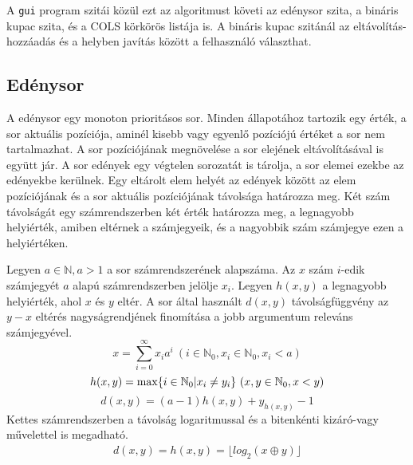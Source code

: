 A \texttt{gui} program szitái közül ezt az algoritmust követi az edénysor szita, a bináris kupac szita, és a COLS körkörös listája is. A bináris kupac szitánál az eltávolítás-hozzáadás és a helyben javítás között a felhasználó választhat.

\subsection{Edénysor}

A edénysor egy monoton prioritásos sor.
Minden állapotához tartozik egy érték, a sor aktuális pozíciója, aminél kisebb vagy egyenlő pozíciójú értéket a sor nem tartalmazhat.
A sor pozíciójának megnövelése a sor elejének eltávolításával is együtt jár.
A sor edények egy végtelen sorozatát is tárolja, a sor elemei ezekbe az edényekbe kerülnek.
Egy eltárolt elem helyét az edények között az elem pozíciójának és a sor aktuális pozíciójának távolsága határozza meg.
Két szám távolságát egy számrendszerben két érték határozza meg, a legnagyobb helyiérték, amiben eltérnek a számjegyeik, és a nagyobbik szám számjegye ezen a helyiértéken.

Legyen $a \in \mathbb{N}, a > 1$ a sor számrendszerének alapszáma.
Az $x$ szám $i$-edik számjegyét $a$ alapú számrendszerben jelölje $x_i$.
Legyen $h(x, y)$ a legnagyobb helyiérték, ahol $x$ és $y$ eltér.
A sor által használt $d(x, y)$ távolságfüggvény az $y-x$ eltérés nagyságrendjének finomítása a jobb argumentum releváns számjegyével.
\begin{equation}
x = \sum_{i=0}^{\infty} x_i a^i\ (i \in \mathbb{N}_0, x_i \in \mathbb{N}_0, x_i < a)
\end{equation}
\begin{equation}
h(x, y) = \max \lbrace i \in \mathbb{N}_0 | x_i \not= y_i\rbrace \ (x, y \in \mathbb{N}_0, x<y)\\
\end{equation}
\begin{equation}
\label{ddef}
d(x, y) = (a-1) h(x, y) + y_{h(x, y)} - 1
\end{equation}
Kettes számrendszerben a távolság logaritmussal és a bitenkénti kizáró-vagy művelettel is megadható.
\begin{align*}
d(x, y) = h(x, y) = \lfloor log_2{(x \oplus y)} \rfloor
\end{align*}

